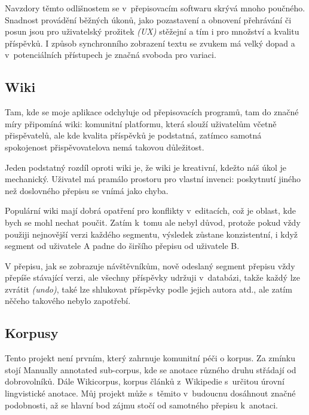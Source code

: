 \vspace{5mm}

Navzdory těmto odlišnostem se v~přepisovacím softwaru skrývá mnoho poučného.
Snadnost provádění běžných úkonů, jako pozastavení a obnovení přehrávání či
posun jsou pro uživatelský prožitek {\em (UX)} stěžejní a tím i pro množství a kvalitu
příspěvků. I způsob synchronního zobrazení textu se zvukem má velký dopad a
v~potenciálních přístupech je značná svoboda pro variaci.

\subsection{Wiki}

Tam, kde se moje aplikace odchyluje od přepisovacích programů, tam do značné
míry připomíná wiki: komunitní platformu, která slouží uživatelům včetně
přispěvatelů, ale kde kvalita příspěvků je podstatná, zatímco samotná
spokojenost přispěvovatelova nemá takovou důležitost.

Jeden podstatný rozdíl oproti wiki je, že wiki je kreativní, kdežto náš úkol je
mechanický. Uživatel má pramálo prostoru pro vlastní invenci: poskytnutí jiného
než doslovného přepisu se vnímá jako chyba.

Populární wiki mají dobrá opatření pro konflikty v~editacích, což je oblast, kde
bych se mohl nechat poučit. Zatím k~tomu ale nebyl důvod, protože pokud vždy
použiji nejnovější verzi každého segmentu, výsledek zůstane konzistentní, i když
segment od uživatele A padne do širšího přepisu od uživatele B.

V přepisu, jak se zobrazuje návštěvníkům, nově odeslaný segment přepisu vždy
přepíše stávající verzi, ale všechny příspěvky udržuji v~databázi, takže každý
lze zvrátit {\em (undo)}, také lze shlukovat příspěvky podle jejich autora atd.,
ale zatím něčeho takového nebylo zapotřebí.

\subsection{Korpusy}
\label{ssec:setting-corpora}

Tento projekt není prvním, který zahrnuje komunitní péči o korpus. Za zmínku
stojí Manually annotated sub-corpus\cite{ide2010manually}, kde se anotace různého
druhu střádají od dobrovolníků. Dále Wikicorpus\cite{reese2010wikicorpus},
korpus článků z~Wikipedie s~určitou úrovní lingvistické anotace. Můj projekt
může s~těmito v~budoucnu dosáhnout značné podobnosti, až se hlavní bod zájmu
stočí od samotného přepisu k~anotaci.

